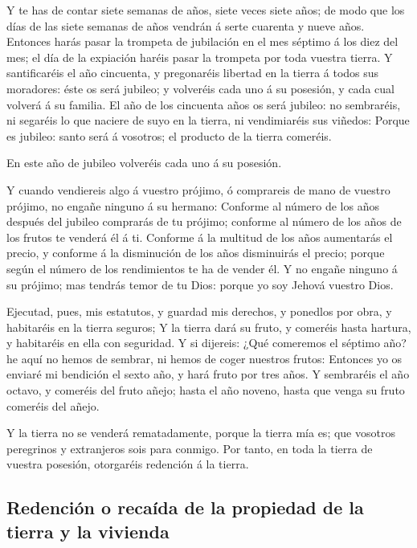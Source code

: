  Y te has de contar siete semanas de años, siete veces
siete años; de modo que los días de las siete semanas de años vendrán á
serte cuarenta y nueve años.  Entonces harás pasar la
trompeta de jubilación en el mes séptimo á los diez del mes; el día de
la expiación haréis pasar la trompeta por toda vuestra tierra.
 Y santificaréis el año cincuenta, y pregonaréis libertad
en la tierra á todos sus moradores: éste os será jubileo; y volveréis
cada uno á su posesión, y cada cual volverá á su familia.
 El año de los cincuenta años os será jubileo: no
sembraréis, ni segaréis lo que naciere de suyo en la tierra, ni
vendimiaréis sus viñedos:  Porque es jubileo: santo será
á vosotros; el producto de la tierra comeréis.

 En este año de jubileo volveréis cada uno á su posesión.

 Y cuando vendiereis algo á vuestro prójimo, ó comprareis
de mano de vuestro prójimo, no engañe ninguno á su hermano:
 Conforme al número de los años después del jubileo
comprarás de tu prójimo; conforme al número de los años de los frutos te
venderá él á ti.  Conforme á la multitud de los años
aumentarás el precio, y conforme á la disminución de los años
disminuirás el precio; porque según el número de los rendimientos te ha
de vender él.  Y no engañe ninguno á su prójimo; mas
tendrás temor de tu Dios: porque yo soy Jehová vuestro Dios.

 Ejecutad, pues, mis estatutos, y guardad mis derechos, y
ponedlos por obra, y habitaréis en la tierra seguros;  Y
la tierra dará su fruto, y comeréis hasta hartura, y habitaréis en ella
con seguridad.  Y si dijereis: ¿Qué comeremos el séptimo
año? he aquí no hemos de sembrar, ni hemos de coger nuestros frutos:
 Entonces yo os enviaré mi bendición el sexto año, y hará
fruto por tres años.  Y sembraréis el año octavo, y
comeréis del fruto añejo; hasta el año noveno, hasta que venga su fruto
comeréis del añejo.

 Y la tierra no se venderá rematadamente, porque la
tierra mía es; que vosotros peregrinos y extranjeros sois para conmigo.
 Por tanto, en toda la tierra de vuestra posesión,
otorgaréis redención á la tierra.

\hypertarget{redenciuxf3n-o-recauxedda-de-la-propiedad-de-la-tierra-y-la-vivienda}{%
\subsection{Redención o recaída de la propiedad de la tierra y la
vivienda}\label{redenciuxf3n-o-recauxedda-de-la-propiedad-de-la-tierra-y-la-vivienda}}


